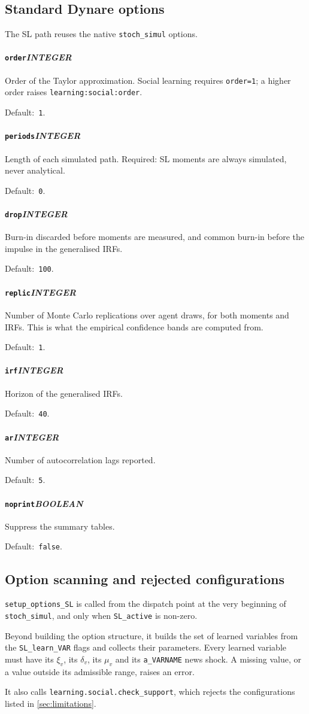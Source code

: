 \documentclass[11pt,a4paper]{article}
\newcommand{\optentry}[4]{%
    \paragraph{\texttt{#1}\hfill\textnormal{\textit{#2}}}%
    #4\par\smallskip\noindent Default:~\texttt{#3}.\par\medskip
}
\newcommand{\command}[1]{\texttt{#1}}
\newcommand{\option}[1]{\texttt{#1}}
\begin{document}
\subsection{Standard Dynare options}
\label{sec:simulation:std_options}

The SL path reuses the native \command{stoch\_simul} options.

\optentry{order}{INTEGER}{1}{%
    Order of the Taylor approximation. Social learning requires
    \option{order=1}; a higher order raises
    \texttt{learning:social:order}.}

\optentry{periods}{INTEGER}{0}{%
    Length of each simulated path. Required: SL moments are always simulated,
    never analytical. }

\optentry{drop}{INTEGER}{100}{%
    Burn-in discarded before moments are measured, and common burn-in before
    the impulse in the generalised IRFs.}

\optentry{replic}{INTEGER}{1}{%
    Number of Monte Carlo replications over agent draws, for both moments and
    IRFs. This is what the empirical confidence bands are computed from.}

\optentry{irf}{INTEGER}{40}{%
    Horizon of the generalised IRFs.}

\optentry{ar}{INTEGER}{5}{%
    Number of autocorrelation lags reported.}

\optentry{noprint}{BOOLEAN}{false}{%
    Suppress the summary tables.}

\subsection{Option scanning and rejected configurations}
\label{sec:simulation:setup_options}

\texttt{setup\_options\_SL} is called from the dispatch point at the very
beginning of \command{stoch\_simul}, and only when \texttt{SL\_active} is
non-zero.

Beyond building the option structure, it builds the set of learned variables
from the \texttt{SL\_learn\_VAR} flags and collects their parameters. Every
learned variable must have its $\xi_v$, its $\delta_v$, its $\mu_v$ and its
\texttt{a\_VARNAME} news shock. A missing value, or a value outside its
admissible range, raises an error.

It also calls \texttt{learning.social.check\_support}, which rejects the
configurations listed in \cref{sec:limitations}.
\end{document}

